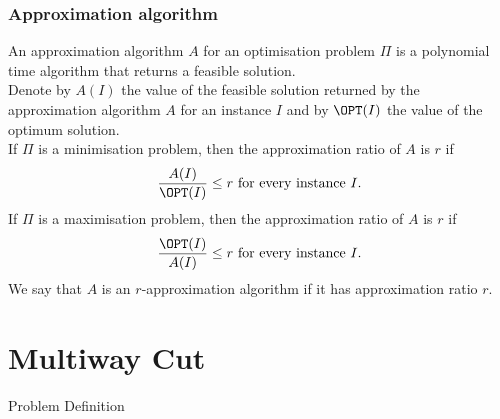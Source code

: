 \begin{frame}
	\frametitle{Approximation algorithm}
	
	\begin{definition}
		An \alert{approximation algorithm} $A$ for an optimisation problem $\Pi$ is a polynomial time algorithm that returns a feasible solution.\\
		Denote by $A(I)$ the value of the feasible solution returned by the approximation algorithm $A$ for an instance $I$ and by $\OPT(I)$ the value of the optimum solution.\\
		If $\Pi$ is a minimisation problem, then the \alert{approximation ratio} of $A$ is $r$ if
		\begin{align*}
		 \frac{A(I)}{\OPT(I)} \le r \text{ for every instance $I$.}
		\end{align*}
		If $\Pi$ is a maximisation problem, then the \alert{approximation ratio} of $A$ is $r$ if
		\begin{align*}
		 \frac{\OPT(I)}{A(I)} \le r \text{ for every instance $I$.}
		\end{align*}
		We say that $A$ is an $r$-approximation algorithm if it has approximation ratio $r$.
	\end{definition}
\end{frame}

\section{Multiway Cut}

\begin{frame}{Problem Definition}


 \begin{center}
 \end{center}

\end{frame}

